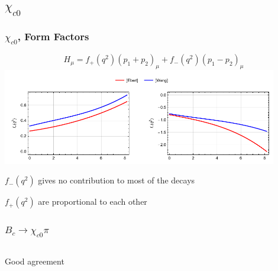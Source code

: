 \documentclass{beamer}
\begin{document}
\subsection{$\chi_{c0}$}
\begin{frame}
  \frametitle{$\chi_{c0}$, Form Factors}
  $$
  H_\mu = f_{+}\left(q^2\right) \left(p_1+p_2\right)_\mu + f_{-}\left(q^2\right) \left(p_1-p_2\right)_\mu 
  $$
  \includegraphics[width=0.9\textwidth]{figs/ff_chi_c0}

  $f_{-}(q^2)$ gives no contribution to most of the decays
  
  $f_{+}(q^2)$ are proportional to each other
\end{frame}

\newcommand{\Br}{\mathrm{Br}}

\begin{frame}
  \frametitle{$B_c \to \chi_{c0} \pi$}
  \begin{columns}
    \begin{column}{0.5\textwidth}
      \centering{[Ebert]:}
      
    \end{column}
    \begin{column}{0.5\textwidth}
      \centering{[Wang]:}
      
    \end{column}
  \end{columns}
  \vspace{2cm}
  Good agreement
\end{frame}

\newcommand{\VSpace}{}
\end{document}
